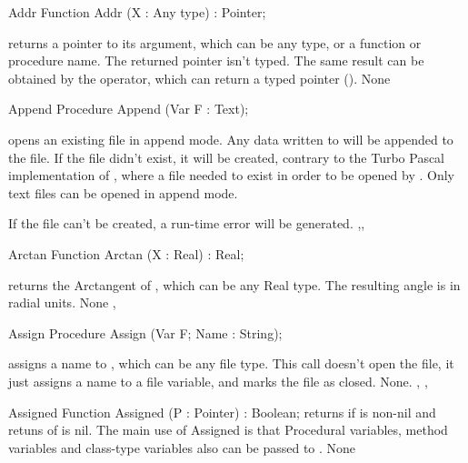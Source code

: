 \documentclass{report}
\begin{document}

\begin{function}{Addr}
\Declaration
Function Addr (X : Any type) : Pointer;

\Description
{} returns a pointer to its argument, which can be any type, or a
function or procedure name. The returned pointer isn't typed.
The same result can be obtained by the  operator, which can return a
typed pointer (\progref).
\Errors
None
\SeeAlso
{}
\end{function}


\begin{procedure}{Append}
\Declaration
Procedure Append (Var F : Text);

\Description
{} opens an existing file in append mode. Any data written to
 will be appended to the file. If the file didn't exist, it will be
created, contrary to the Turbo Pascal implementation of , where
a file needed to exist in order to be opened by
.
Only text files can be opened in append mode.

\Errors
If the file can't be created, a run-time error will be generated.
\SeeAlso
{},, 
\end{procedure}


\begin{function}{Arctan}
\Declaration
Function Arctan (X : Real) : Real;

\Description
{} returns the Arctangent of , which can be any Real type.
The resulting angle is in radial units.
\Errors
None
\SeeAlso
{}, 
\end{function}


\begin{procedure}{Assign}
\Declaration
Procedure Assign (Var F; Name : String);

\Description
{} assigns a name to , which can be any file type.
This call doesn't open the file, it just assigns a name to a file variable,
and marks the file as closed.
\Errors
None.
\SeeAlso
{}, , 
\end{procedure}


\begin{function}{Assigned}
\Declaration
Function Assigned (P : Pointer) : Boolean;
\Description
{} returns  if  is non-nil
and retuns  of  is nil.
The main use of Assigned is that Procedural variables, method variables and
class-type variables also can be passed to .
\Errors
None
\SeeAlso
{}
\end{function}
\end{document}
